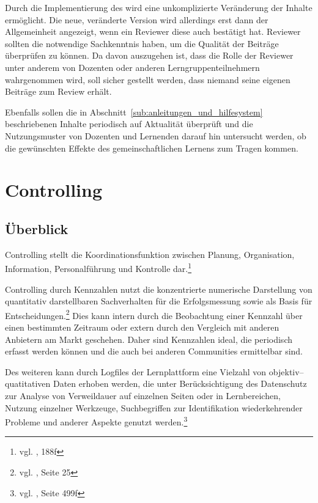 Durch die Implementierung des  wird eine unkomplizierte Veränderung der Inhalte ermöglicht. Die neue, veränderte Version wird allerdings erst dann der Allgemeinheit angezeigt, wenn ein Reviewer diese auch bestätigt hat. Reviewer sollten die notwendige Sachkenntnis haben, um die Qualität der Beiträge überprüfen zu können.  Da davon auszugehen ist, dass die Rolle der Reviewer unter anderem von Dozenten oder anderen Lerngruppenteilnehmern wahrgenommen wird, soll sicher gestellt werden, dass niemand seine eigenen Beiträge zum Review erhält.

Ebenfalls sollen die in Abschnitt~\ref{sub:anleitungen_und_hilfesystem} beschriebenen Inhalte periodisch auf Aktualität überprüft und die Nutzungsmuster von Dozenten und Lernenden darauf hin untersucht werden, ob die gewünschten Effekte des gemeinschaftlichen Lernens zum Tragen kommen.

\section{Controlling} %
\label{sec:controlling}

\subsection{Überblick} %
\label{sub:uberblick}
Controlling stellt die Koordinationsfunktion zwischen Planung, Organisation, Information, Personalführung und Kontrolle dar.\footnote{vgl. \cite{woehe}, 188f}

Controlling durch Kennzahlen nutzt die konzentrierte numerische Darstellung von quantitativ darstellbaren Sachverhalten für die Erfolgsmessung sowie als Basis für Entscheidungen.\footnote{vgl. \cite{reichmann}, Seite 25} Dies kann intern durch die Beobachtung einer Kennzahl über einen bestimmten Zeitraum oder extern durch den Vergleich mit anderen Anbietern am Markt geschehen. Daher sind Kennzahlen ideal, die periodisch erfasst werden können und die auch bei anderen Communities ermittelbar sind.

Des weiteren kann durch Logfiles der Lernplattform eine Vielzahl von objektiv–quatitativen Daten erhoben werden, die unter Berücksichtigung des Datenschutz zur Analyse von Verweildauer auf einzelnen Seiten oder in Lernbereichen, Nutzung einzelner Werkzeuge, Suchbegriffen zur Identifikation wiederkehrender Probleme und anderer Aspekte genutzt werden.\footnote{vgl. \cite{euler}, Seite 499f}

